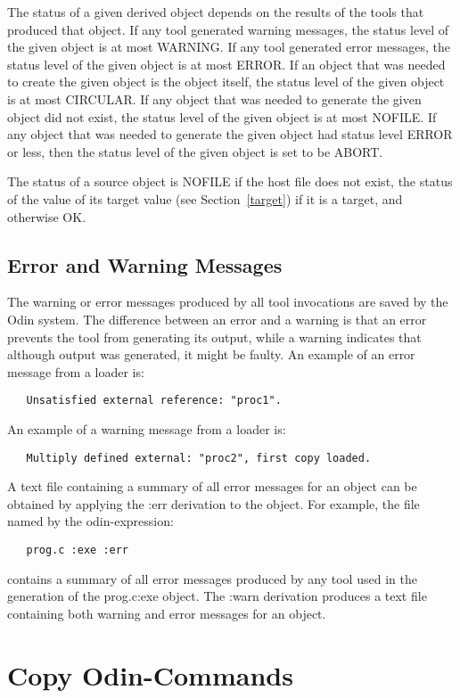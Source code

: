 The status of a given derived object depends on
the results of the tools that produced that object.
If any tool generated warning messages,
the status level of the given object is at most {\ex WARNING}.
If any tool generated error messages,
the status level of the given object is at most {\ex ERROR}.
If an object that was needed to create the
given object is the object itself,
the status level of the given object is at most {\ex CIRCULAR}.
If any object that was needed to generate the given object did not exist,
the status level of the given object is at most {\ex NOFILE}.
If any object that was needed to
generate the given object had status level {\ex ERROR} or less,
then the status level of the given object is set to be {\ex ABORT}.

The status of a source object is {\ex NOFILE}
if the host file does not exist,
the status of the value of its target value (see Section~\ref{target})
if it is a target, and otherwise {\ex OK}.

\subsection{Error and Warning Messages}

The warning or error messages produced by all tool invocations
are saved by the Odin system.
The difference between an error and a warning is that
an error prevents the tool from generating its output,
while a warning indicates that although output was generated,
it might be faulty.
An example of an error message from a loader is:
\begin{verbatim}
   Unsatisfied external reference: "proc1".
\end{verbatim}
An example of a warning message from a loader is:
\begin{verbatim}
   Multiply defined external: "proc2", first copy loaded.
\end{verbatim}

A text file containing a summary of all error messages for an object
can be obtained by applying the {\ex :err} derivation to the object.
For example, the file named by the odin-expression:
\begin{verbatim}
   prog.c :exe :err
\end{verbatim}
contains a summary of all error messages 
produced by any tool used in the generation of the {\ex prog.c:exe} object.
The {\ex :warn} derivation produces a text file containing both
warning and error messages for an object.


\section{Copy Odin-Commands}
\label{copy}

